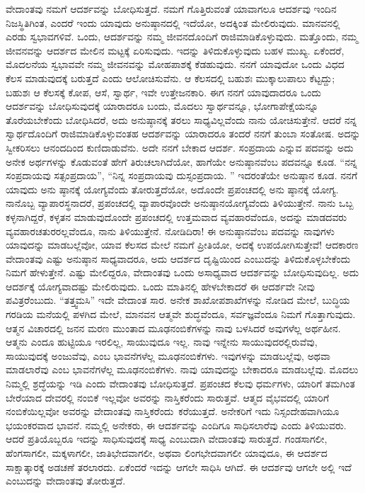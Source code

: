 ವೇದಾಂತವು ನಮಗೆ ಆದರ್ಶವನ್ನು ಬೋಧಿಸುತ್ತದೆ. ನಮಗೆ ಗೊತ್ತಿರುವಂತೆ ಯಾವಾಗಲೂ ಆದರ್ಶವು ಇಂದಿನ ನಿಜಸ್ಥಿತಿಗಿಂತ, ಎಂದರೆ ಇಂದು ಯಾವುದು ಅನುಷ್ಠಾನದಲ್ಲಿ ಇದೆಯೋ, ಅದಕ್ಕಿಂತ ಮೇಲಿರುವುದು. ಮಾನವನಲ್ಲಿ ಎರಡು ಸ್ವಭಾವಗಳಿವೆ. ಒಂದು, ಆದರ್ಶವನ್ನು ನಮ್ಮ ಜೀವನದೊಂದಿಗೆ ರಾಜಿಮಾಡಿಕೊಳ್ಳುವುದು. ಮತ್ತೊಂದು, ನಮ್ಮ ಜೀವನವನ್ನು ಆದರ್ಶದ ಮೇಲಿನ ಮಟ್ಟಕ್ಕೆ ಏರಿಸುವುದು. ಇದನ್ನು ತಿಳಿದುಕೊಳ್ಳುವುದು ಬಹಳ ಮುಖ್ಯ. ಏಕೆಂದರೆ, ಮೊದಲನೆಯ ಸ್ವಭಾವವೇ ನಮ್ಮ ಜೀವನವನ್ನು ಮೋಹಪಾಶಕ್ಕೆ ಕೆಡಹುವುದು. ನನಗೆ ಯಾವುದೋ ಒಂದು ವಿಧದ ಕೆಲಸ ಮಾಡುವುದಕ್ಕೆ ಬರುತ್ತದೆ ಎಂದು ಆಲೋಚಿಸುವೆನು. ಆ ಕೆಲಸದಲ್ಲಿ ಬಹುಶಃ ಮುಕ್ಕಾಲುಪಾಲು ಕೆಟ್ಟದ್ದು; ಬಹುಶಃ ಆ ಕೆಲಸಕ್ಕೆ ಕೋಪ, ಆಸೆ, ಸ್ವಾರ್ಥ, ಇವೇ ಉತ್ತೇಜನಕಾರಿ. ಈಗ ನನಗೆ ಯಾವುದಾದರೂ ಒಂದು ಆದರ್ಶವನ್ನು ಬೋಧಿಸುವುದಕ್ಕೆ ಯಾರಾದರೂ ಬಂದು, ಮೊದಲು ಸ್ವಾರ್ಥವನ್ನೂ, ಭೋಗಾಪೇಕ್ಷೆಯನ್ನೂ ತೊರೆಯಬೇಕೆಂದು ಬೋಧಿಸಿದರೆ, ಅದು ಅನುಷ್ಠಾನಕ್ಕೆ ತರಲು ಸಾಧ್ಯವಿಲ್ಲವೆಂದು ನಾನು ಯೋಚಿಸುತ್ತೇನೆ. ಆದರೆ ನನ್ನ ಸ್ವಾರ್ಥದೊಂದಿಗೆ ರಾಜಿಮಾಡಿಕೊಳ್ಳುವಂತಹ ಆದರ್ಶವನ್ನು ಯಾರಾದರೂ ತಂದರೆ ನನಗೆ ತುಂಬಾ ಸಂತೋಷ. ಅದನ್ನು ಸ್ವೀಕರಿಸಲು ಆನಂದದಿಂದ ಕುಣಿದಾಡುವೆನು. ಅದೇ ನನಗೆ ಬೇಕಾದ ಆದರ್ಶ. ಸಂಪ್ರದಾಯ ಎನ್ನುವ ಪದವನ್ನು ಅದು ಅನೇಕ ಅರ್ಥಗಳನ್ನು ಕೊಡುವಂತೆ ಹೇಗೆ ತಿರುಚಲಾಗಿದೆಯೋ, ಹಾಗೆಯೇ ಅನುಷ್ಠಾನವೆಂಬ ಪದವನ್ನೂ ಕೂಡ. “ನನ್ನ ಸಂಪ್ರದಾಯವು ಸತ್ಸಂಪ್ರದಾಯ”, “ನಿನ್ನ ಸಂಪ್ರದಾಯವು ದುಸ್ಸಂಪ್ರದಾಯ. ” ಇದರಂತೆಯೇ ಅನುಷ್ಠಾನ ಕೂಡ. ನನಗೆ ಯಾವುದು ಅನು ಷ್ಠಾನಕ್ಕೆ ಯೋಗ್ಯವೆಂದು ತೋರುತ್ತದೆಯೋ, ಅದೊಂದೇ ಪ್ರಪಂಚದಲ್ಲಿ ಅನು ಷ್ಠಾನಕ್ಕೆ ಯೋಗ್ಯ. ನಾನೊಬ್ಬ ವ್ಯಾಪಾರಸ್ಥನಾದರೆ, ಪ್ರಪಂಚದಲ್ಲಿ ವ್ಯಾಪಾರವೊಂದೇ ಅನುಷ್ಠಾನಯೋಗ್ಯವೆಂದು ತಿಳಿಯುತ್ತೇನೆ. ನಾನು ಒಬ್ಬ ಕಳ್ಳನಾಗಿದ್ದರೆ, ಕಳ್ಳತನ ಮಾಡುವುದೊಂದೇ ಪ್ರಪಂಚದಲ್ಲಿ ಉತ್ತಮವಾದ ವ್ಯವಹಾರವೆಂದೂ, ಅದನ್ನು ಮಾಡದವರು ವ್ಯವಹಾರಚತುರರಲ್ಲವೆಂದೂ, ನಾನು ತಿಳಿಯುತ್ತೇನೆ. ನೋಡಿದಿರಾ! ಈ ಅನುಷ್ಠಾನವೆಂಬ ಪದವನ್ನು ನಾವುಗಳು ಯಾವುದನ್ನು ಮಾಡಬಲ್ಲೆವೋ, ಯಾವ ಕೆಲಸದ ಮೇಲೆ ನಮಗೆ ಪ್ರೀತಿಯೋ, ಅದಕ್ಕೆ ಉಪಯೋಗಿಸುತ್ತೇವೆ! ಆದಕಾರಣ ವೇದಾಂತವು ಎಷ್ಟು ಅನುಷ್ಠಾನ ಸಾಧ್ಯವಾದರೂ, ಅದು ಆದರ್ಶದ ದೃಷ್ಟಿಯಿಂದ ಎಂಬುದನ್ನು ತಿಳಿದುಕೊಳ್ಳಬೇಕೆಂದು ನಿಮಗೆ ಹೇಳುತ್ತೇನೆ. ಎಷ್ಟು ಮೇಲಿದ್ದರೂ, ವೇದಾಂತವು ಒಂದು ಅಸಾಧ್ಯವಾದ ಆದರ್ಶವನ್ನು ಬೋಧಿಸುವುದಿಲ್ಲ. ಅದು ಆದರ್ಶಕ್ಕೆ ಯೋಗ್ಯವಾದಷ್ಟು ಮೇಲಿರುವುದು. ಒಂದು ಮಾತಿನಲ್ಲಿ ಹೇಳಬೇಕಾದರೆ ಈ ಆದರ್ಶವೇ ನೀವು ಪವಿತ್ರರೆಂಬುದು. “ತತ್ತ್ವಮಸಿ” ಇದೇ ವೇದಾಂತ ಸಾರ. ಅನೇಕ ಶಾಖೋಪಶಾಖೆಗಳನ್ನು ನೋಡಿದ ಮೇಲೆ, ಬುದ್ಧಿಯ ಗರಡಿಯ ಮನೆಯಲ್ಲಿ ಪಳಗಿದ ಮೇಲೆ, ಮಾನವನ ಆತ್ಮವೇ ಶುದ್ಧವೆಂದೂ, ಸರ್ವಜ್ಞವೆಂದೂ ನಿಮಗೆ ಗೊತ್ತಾಗುವುದು. ಆತ್ಮನ ವಿಚಾರದಲ್ಲಿ ಜನನ ಮರಣ ಮುಂತಾದ ಮೂಢನಂಬಿಕೆಗಳನ್ನು ನಾವು ಬಳಸಿದರೆ ಅವುಗಳೆಲ್ಲ ಅರ್ಥಹೀನ. ಆತ್ಮನು ಎಂದೂ ಹುಟ್ಟಿಯೂ ಇರಲಿಲ್ಲ, ಸಾಯುವುದೂ ಇಲ್ಲ. ನಾವು ಇನ್ನೇನು ಸಾಯುವುದರಲ್ಲಿರುವೆವು, ಸಾಯುವುದಕ್ಕೆ ಅಂಜುವೆವು, ಎಂಬ ಭಾವನೆಗಳೆಲ್ಲ ಮೂಢನಂಬಿಕೆಗಳು. ಇವುಗಳನ್ನು ಮಾಡಬಲ್ಲೆವು, ಅಥವಾ ಮಾಡಲಾರೆವು ಎಂಬ ಭಾವನೆಗಳೆಲ್ಲ ಮೂಢನಂಬಿಕೆಗಳು. ನಾವು ಯಾವುದನ್ನು ಬೇಕಾದರೂ ಮಾಡಬಲ್ಲೆವು. ಮೊದಲು ನಿಮ್ಮಲ್ಲಿ ಶ್ರದ್ಧೆಯನ್ನು ಇಡಿ ಎಂದು ವೇದಾಂತವು ಬೋಧಿಸುತ್ತದೆ. ಪ್ರಪಂಚದ ಕೆಲವು ಧರ್ಮಗಳು, ಯಾರಿಗೆ ತಮಗಿಂತ ಬೇರೆಯಾದ ದೇವರಲ್ಲಿ ನಂಬಿಕೆ ಇಲ್ಲವೋ ಅವರನ್ನು ನಾಸ್ತಿಕರೆಂದು ಸಾರುತ್ತವೆ. ಆತ್ಮದ ವೈಭವದಲ್ಲಿ ಯಾರಿಗೆ ನಂಬಿಕೆಯಿಲ್ಲವೋ ಅವರನ್ನು ವೇದಾಂತವು ನಾಸ್ತಿಕರೆಂದು\break\ ಕರೆಯುತ್ತದೆ. ಅನೇಕರಿಗೆ ಇದು ನಿಸ್ಸಂದೇಹವಾಗಿಯೂ ಭಯಂಕರವಾದ ಭಾವನೆ. ನಮ್ಮಲ್ಲಿ ಅನೇಕರು, ಈ ಆದರ್ಶವನ್ನು ಎಂದಿಗೂ ಸಾಧಿಸಲಾರೆವು ಎಂದು ತಿಳಿಯುವರು. ಆದರೆ ಪ್ರತಿಯೊಬ್ಬರೂ ಇದನ್ನು ಸಾಧಿಸುವುದಕ್ಕೆ ಸಾಧ್ಯ ಎಂಬುದಾಗಿ ವೇದಾಂತವು ಸಾರುತ್ತದೆ. ಗಂಡಸಾಗಲೀ, ಹೆಂಗಸಾಗಲೀ, ಮಕ್ಕಳಾಗಲೀ, ಜಾತಿಭೇದವಾಗಲೀ, ಅಥವಾ ಲಿಂಗಭೇದವಾಗಲೀ ಯಾವುದೂ, ಈ ಆದರ್ಶದ ಸಾಕ್ಷಾತ್ಕಾರಕ್ಕೆ ಅಡಚಣೆ ತರಲಾರದು. ಏಕೆಂದರೆ ಇದನ್ನು ಆಗಲೇ ಸಾಧಿಸಿ ಆಗಿದೆ. ಈ ಆದರ್ಶವು ಆಗಲೇ ಅಲ್ಲಿ ಇದೆ ಎಂಬುದನ್ನು ವೇದಾಂತವು ತೋರುತ್ತದೆ. 

